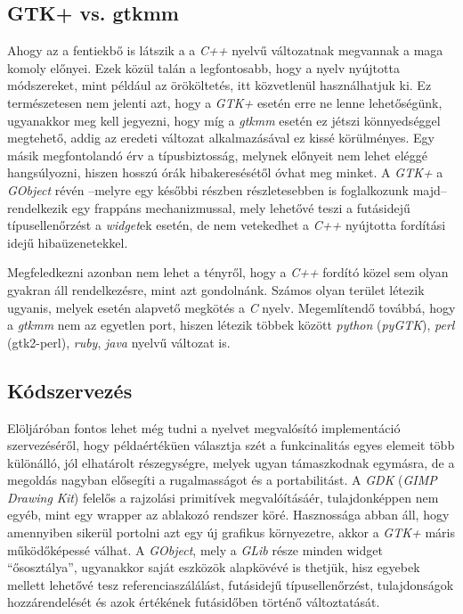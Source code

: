 \subsection{GTK+ vs. gtkmm}
Ahogy az a fentiekbő is látszik a a \textit{C++} nyelvű változatnak megvannak a maga komoly előnyei. Ezek közül talán a legfontosabb, hogy a nyelv nyújtotta módszereket, mint például az örököltetés, itt közvetlenül használhatjuk ki. Ez természetesen nem jelenti azt, hogy a \textit{GTK+} esetén erre ne lenne lehetőségünk, ugyanakkor meg kell jegyezni, hogy míg a \textit{gtkmm} esetén ez jétszi könnyedséggel megtehető, addig az eredeti változat alkalmazásával ez kissé körülményes. Egy másik megfontolandó érv a típusbiztosság, melynek előnyeit nem lehet eléggé hangsúlyozni, hiszen hosszú órák hibakeresésétől óvhat meg minket. A \textit{GTK+} a \textit{GObject} révén --melyre egy későbbi részben részletesebben is foglalkozunk majd-- rendelkezik egy frappáns mechanizmussal, mely lehetővé teszi a futásidejű típusellenőrzést a \textit{widget}ek esetén, de nem vetekedhet a \textit{C++} nyújtotta fordítási idejű hibaüzenetekkel.

Megfeledkezni azonban nem lehet a tényről, hogy a \textit{C++} fordító közel sem olyan gyakran áll rendelkezésre, mint azt gondolnánk. Számos olyan terület létezik ugyanis, melyek esetén alapvető megkötés a \textit{C} nyelv. Megemlítendő továbbá, hogy a \textit{gtkmm} nem az egyetlen port, hiszen létezik többek között \textit{python} (\textit{pyGTK}), \textit{perl} (gtk2-perl), \textit{ruby}, \textit{java} nyelvű változat is.

\subsection{Kódszervezés}
Elöljáróban fontos lehet még tudni a nyelvet megvalósító implementáció szervezéséről, hogy példaértéküen választja szét a funkcinalitás egyes elemeit több különálló, jól elhatárolt részegységre, melyek ugyan támaszkodnak egymásra, de a megoldás nagyban elősegíti a rugalmasságot és a portabilitást. A \textit{GDK} (\textit{GIMP Drawing Kit}) felelős a rajzolási primitívek megvalóításáér, tulajdonképpen nem egyéb, mint egy wrapper az ablakozó rendszer köré. Hasznossága abban áll, hogy amennyiben sikerül portolni azt egy új grafikus környezetre, akkor a \textit{GTK+} máris működőképessé válhat. A \textit{GObject}, mely a \textit{GLib} része minden widget ``ősosztálya'', ugyanakkor saját eszközök alapkövévé is thetjük, hisz egyebek mellett lehetővé tesz referenciaszálálást, futásidejű típusellenőrzést, tulajdonságok hozzárendelését és azok értékének futásidőben történő változtatását.

